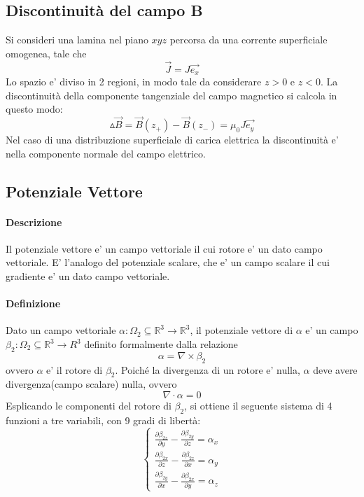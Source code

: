 \documentclass[a4paper, 10pt]{article}
\begin{document}
		\subsection{Discontinuità del campo B}
			Si consideri una lamina nel piano $xyz$ percorsa da una corrente superficiale omogenea, tale che 
			\[ \overrightarrow{J} = J \overrightarrow{e_x} \] Lo spazio e' diviso in 2 regioni, in modo tale da considerare
			$z > 0$ e $z < 0$. La discontinuità della componente tangenziale del campo magnetico si calcola in questo modo:
			\[ \vartriangle \overrightarrow{B} = \overrightarrow{B}(z_+) - \overrightarrow{B}(z_-) = \mu_0 J \overrightarrow{e_y}\]
			Nel caso di una distribuzione superficiale di carica elettrica la discontinuità e' nella componente normale del 
			campo elettrico.
		\subsection{Potenziale Vettore}
			\paragraph*{Descrizione} Il potenziale vettore e' un campo vettoriale il cui rotore e' un dato campo vettoriale. 
			E' l'analogo del potenziale scalare, che e' un campo scalare il cui gradiente e' un dato campo vettoriale.
			\paragraph*{Definizione} Dato un campo vettoriale $ \alpha : \Omega_2 \subseteq \mathbb{R}^3 \rightarrow \mathbb{R}^3$,
			il potenziale vettore di $\alpha$ e' un campo $\beta_2 : \Omega_2 \subseteq \mathbb{R}^3 \rightarrow R^3$ definito
			formalmente dalla relazione 
			\[ \alpha = \nabla \times \beta_2 \] ovvero $\alpha$ e' il rotore di $\beta_2$. Poiché la divergenza di un rotore
			e' nulla, $\alpha$ deve avere divergenza(campo scalare) nulla, ovvero 
			\[ \nabla \cdot \alpha = 0 \]
			Esplicando le componenti del rotore di $\beta_2$, si ottiene il seguente sistema di 4 funzioni a tre variabili, con 
			9 gradi di libertà:
			\[ \begin{cases} 
					\frac{\partial \beta_{2z}}{\partial y} - \frac{\partial \beta_{2y}}{\partial z} = \alpha_x \\
					\frac{\partial \beta_{2x}}{\partial z} - \frac{\partial \beta_{2z}}{\partial x} = \alpha_y \\
					\frac{\partial \beta_{2y}}{\partial x} - \frac{\partial \beta_{2x}}{\partial y} = \alpha_z 
			\end{cases} \]
\end{document}
